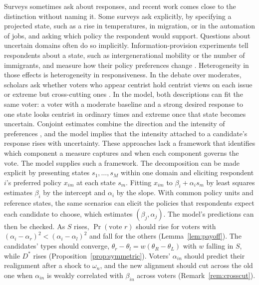 \documentclass[12pt,letterpaper]{article}
\begin{document}
Surveys sometimes ask about responses, and recent work comes close to the distinction without naming it. Some surveys ask explicitly, by specifying a projected state, such as a rise in temperatures, in migration, or in the automation of jobs, and asking which policy the respondent would support. Questions about uncertain domains often do so implicitly. Information-provision experiments tell respondents about a state, such as intergenerational mobility or the number of immigrants, and measure how their policy preferences change \citep{AlesinaStantchevaTeso2018,AlesinaMianoStantcheva2023,HaalandRothWohlfart2023}. Heterogeneity in those effects is heterogeneity in responsiveness. In the debate over moderates, scholars ask whether voters who appear centrist hold centrist views on each issue \citep{Fowler2023} or extreme but cross-cutting ones \citep{Broockman2016,AhlerBroockman2018,Broockman2025}. In the model, both descriptions can fit the same voter: a voter with a moderate baseline and a strong desired response to one state looks centrist in ordinary times and extreme once that state becomes uncertain. Conjoint estimates combine the direction and the intensity of preferences \citep{AbramsonKocakMagazinnik2022}, and the model implies that the intensity attached to a candidate's response rises with uncertainty. These approaches lack a framework that identifies which component a measure captures and when each component governs the vote. The model supplies such a framework. The decomposition can be made explicit by presenting states $s_1,\dots,s_M$ within one domain and eliciting respondent $i$'s preferred policy $x_{im}$ at each state $s_m$. Fitting $x_{im}$ to $\beta_i+\alpha_is_m$ by least squares estimates $\beta_i$ by the intercept and $\alpha_i$ by the slope. With common policy units and reference states, the same scenarios can elicit the policies that respondents expect each candidate to choose, which estimates $(\beta_j,\alpha_j)$. The model's predictions can then be checked. As $S$ rises, $\Pr(\text{vote } r)$ should rise for voters with $(\alpha_i-\alpha_r)^2<(\alpha_i-\alpha_l)^2$ and fall for the others (Lemma~\ref{lem:payoff}). The candidates' types should converge, $\theta_r-\theta_l=w(\theta_R-\theta_L)$ with $w$ falling in $S$, while $D^*$ rises (Proposition~\ref{prop:symmetric}). Voters' $\alpha_{in}$ should predict their realignment after a shock to $\omega_n$, and the new alignment should cut across the old one when $\alpha_{in}$ is weakly correlated with $\beta_{in}$ across voters (Remark~\ref{rem:crosscut}).
\end{document}

